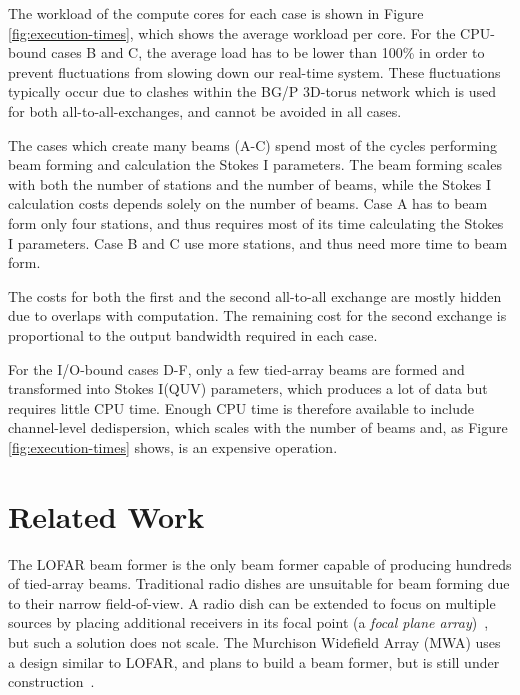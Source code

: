 \documentclass{llncs}
\begin{document}
The workload of the compute cores for each case is shown in Figure \ref{fig:execution-times}, which shows the average workload per core. For the CPU-bound cases B and C, the average load has to be lower than 100\% in order to prevent fluctuations from slowing down our real-time system. These fluctuations typically occur due to clashes within the BG/P 3D-torus network which is used for both all-to-all-exchanges, and cannot be avoided in all cases.

The cases which create many beams (A-C) spend most of the cycles performing beam forming and calculation the Stokes I parameters. The beam forming scales with both the number of stations and the number of beams, while the Stokes I calculation costs depends solely on the number of beams. Case A has to beam form only four stations, and thus requires most of its time calculating the Stokes I parameters. Case B and C use more stations, and thus need more time to beam form.

The costs for both the first and the second all-to-all exchange are mostly hidden due to overlaps with computation. The remaining cost for the second exchange is proportional to the output bandwidth required in each case.

For the I/O-bound cases D-F, only a few tied-array beams are formed and transformed into Stokes I(QUV) parameters, which produces a lot of data but requires little CPU time. Enough CPU time is therefore available to include channel-level dedispersion, which scales with the number of beams and, as Figure \ref{fig:execution-times} shows, is an expensive operation.




\section{Related Work}
\label{Sec:related-work}

The LOFAR beam former is the only beam former capable of producing hundreds of tied-array beams. Traditional radio dishes are unsuitable for beam forming due to their narrow field-of-view. A radio dish can be extended to focus on multiple sources by placing additional receivers in its focal point (a \emph{focal plane array})~\cite{Staveley-Smith:96}, but such a solution does not scale. The Murchison Widefield Array (MWA) uses a design similar to LOFAR, and plans to build a beam former, but is still under construction~\cite{Lonsdale:09}.
\end{document}
